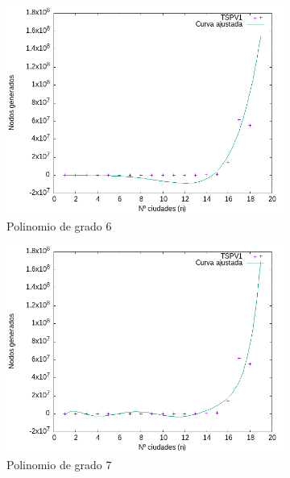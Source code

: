 \documentclass{article}
\begin{document}
\begin{figure}[H]
\centering
    \begin{subfigure}[b]{0.45\textwidth}
        \centering
        \includegraphics[width=\textwidth]{imagenes/cota1/eficiencia_nodos_bk/CurvaAjustada_n6.png}
        \caption{Polinomio de grado 6}
    \end{subfigure}
    \begin{subfigure}[b]{0.45\textwidth}
        \centering
        \includegraphics[width=\textwidth]{imagenes/cota1/eficiencia_nodos_bk/CurvaAjustada_n7.png}
        \caption{Polinomio de grado 7}
    \end{subfigure}
    \begin{subfigure}[b]{0.45\textwidth}

\end{subfigure}
\end{figure}
\end{document}
